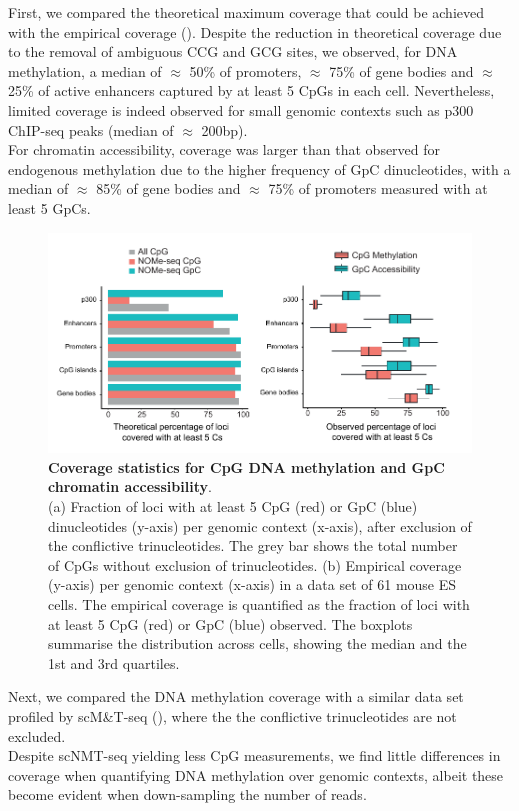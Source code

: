 First, we compared the theoretical maximum coverage that could be achieved with the empirical coverage (). Despite the reduction in theoretical coverage due to the removal of ambiguous CCG and GCG sites, we observed, for DNA methylation, a median of $\approx$ 50\% of promoters, $\approx$ 75\% of gene bodies and $\approx$ 25\% of active enhancers captured by at least 5 CpGs in each cell. Nevertheless, limited coverage is indeed observed for small genomic contexts such as p300 ChIP-seq peaks (median of $\approx$ 200bp).\\
For chromatin accessibility, coverage was larger than that observed for endogenous methylation due to the higher frequency of GpC dinucleotides, with a median of $\approx$ 85\% of gene bodies and $\approx$ 75\% of promoters measured with at least 5 GpCs.

\begin{figure}[H]
	\centering
	\includegraphics[width=1.0\linewidth]{scNMT_coverage}
	\caption[]{\textbf{Coverage statistics for CpG DNA methylation and GpC chromatin accessibility}.\\ 
	(a) Fraction of loci with at least 5 CpG (red) or GpC (blue) dinucleotides (y-axis) per genomic context (x-axis), after exclusion of the conflictive trinucleotides. The grey bar shows the total number of CpGs without exclusion of trinucleotides. (b) Empirical coverage (y-axis) per genomic context (x-axis) in a data set of 61 mouse ES cells. The empirical coverage is quantified as the fraction of loci with at least 5 CpG (red) or GpC (blue) observed. The boxplots summarise the distribution across cells, showing the median and the 1st and 3rd quartiles.}
	\label{fig:scnmt_coverage}
\end{figure}

Next, we compared the DNA methylation coverage with a similar data set profiled by scM\&T-seq \cite{Angermueller2016} (), where the the conflictive trinucleotides are not excluded.\\
Despite scNMT-seq yielding less CpG measurements, we find little differences in coverage when quantifying DNA methylation over genomic contexts, albeit these become evident when down-sampling the number of reads.

